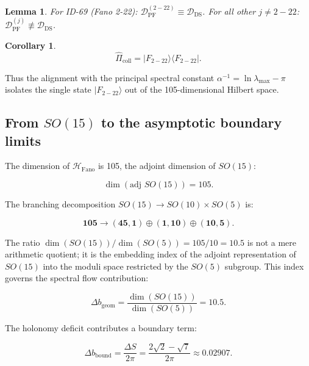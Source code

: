 \documentclass[12pt]{article}
\numberwithin{equation}{section}
\newtheorem{lemma}[theorem]{Lemma}
\newtheorem{corollary}[theorem]{Corollary}
\begin{document}
\begin{lemma}\label{lem:fano_id}
For ID-69 (Fano 2-22): \(\mathcal{D}_{\text{PF}}^{(2-22)} \equiv \mathcal{D}_{\text{DS}}\). For all other \(j \neq 2-22\): \(\mathcal{D}_{\text{PF}}^{(j)} \not\equiv \mathcal{D}_{\text{DS}}\).
\end{lemma}

\begin{corollary}\label{cor:collapse}
\[
\hat{\Pi}_{\text{coll}} = |F_{2-22}\rangle\langle F_{2-22}|.
\]
\end{corollary}

Thus the alignment with the principal spectral constant \(\alpha^{-1} = \ln\lambda_{\max} - \pi\) isolates the single state \(|F_{2-22}\rangle\) out of the 105-dimensional Hilbert space.

\subsection{From \(SO(15)\) to the asymptotic boundary limits}

The dimension of \(\mathcal{H}_{\text{Fano}}\) is 105, the adjoint dimension of \(SO(15)\):

\begin{equation}\label{eq:so15_dim}
\dim(\text{adj } SO(15)) = 105.
\end{equation}

The branching decomposition \(SO(15) \to SO(10) \times SO(5)\) is:

\begin{equation}\label{eq:branching}
\mathbf{105} \to (\mathbf{45}, \mathbf{1}) \oplus (\mathbf{1}, \mathbf{10}) \oplus (\mathbf{10}, \mathbf{5}).
\end{equation}

The ratio \(\dim(SO(15))/\dim(SO(5)) = 105/10 = 10.5\) is not a mere arithmetic quotient; it is the embedding index of the adjoint representation of \(SO(15)\) into the moduli space restricted by the \(SO(5)\) subgroup. This index governs the spectral flow contribution:

\begin{equation}\label{eq:deltab_geom}
\Delta b_{\text{geom}} = \frac{\dim(SO(15))}{\dim(SO(5))} = 10.5.
\end{equation}

The holonomy deficit contributes a boundary term:

\begin{equation}\label{eq:deltab_bound}
\Delta b_{\text{bound}} = \frac{\Delta S}{2\pi} = \frac{2\sqrt{2} - \sqrt{7}}{2\pi} \approx 0.02907.
\end{equation}
\end{document}
